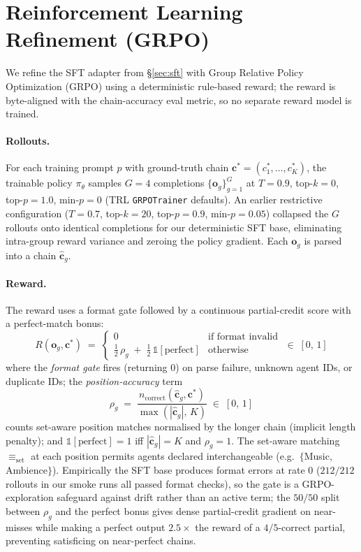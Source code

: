 \section{Reinforcement Learning Refinement (GRPO)}
\label{sec:grpo}

We refine the SFT adapter from \S\ref{sec:sft} with Group Relative
Policy Optimization (GRPO) using a deterministic rule-based reward;
the reward is byte-aligned with the chain-accuracy eval metric, so no
separate reward model is trained.

\paragraph{Rollouts.}
For each training prompt $p$ with ground-truth chain
$\mathbf{c}^*\!=\!(c^*_1,\dots,c^*_K)$, the trainable policy
$\pi_\theta$ samples $G\!=\!4$ completions $\{\mathbf{o}_g\}_{g=1}^{G}$
at $T\!=\!0.9$, top-$k\!=\!0$, top-$p\!=\!1.0$, min-$p\!=\!0$ (TRL
\texttt{GRPOTrainer} defaults). An earlier restrictive configuration
($T\!=\!0.7$, top-$k\!=\!20$, top-$p\!=\!0.9$, min-$p\!=\!0.05$)
collapsed the $G$ rollouts onto identical completions for our
deterministic SFT base, eliminating intra-group reward variance and
zeroing the policy gradient. Each $\mathbf{o}_g$ is parsed into a
chain $\hat{\mathbf{c}}_g$.

\paragraph{Reward.}
The reward uses a format gate followed by a continuous partial-credit
score with a perfect-match bonus:
\begin{equation}
R(\mathbf{o}_g,\mathbf{c}^*)
\;=\;
\begin{cases}
0 & \text{if format invalid} \\
\tfrac{1}{2}\,\rho_g \;+\; \tfrac{1}{2}\,\mathbb{1}[\text{perfect}] & \text{otherwise}
\end{cases}
\;\in\;[0,\,1]
\end{equation}
where the \emph{format gate} fires (returning $0$) on parse failure,
unknown agent IDs, or duplicate IDs; the \emph{position-accuracy} term
\begin{equation}
\rho_g \;=\; \frac{n_\text{correct}(\hat{\mathbf{c}}_g,\mathbf{c}^*)}
                 {\max(|\hat{\mathbf{c}}_g|,\,K)}
\;\in\;[0,\,1]
\end{equation}
counts set-aware position matches normalised by the longer chain
(implicit length penalty); and $\mathbb{1}[\text{perfect}]\!=\!1$ iff
$|\hat{\mathbf{c}}_g|\!=\!K$ and $\rho_g\!=\!1$. The set-aware
matching $\equiv_\text{set}$ at each position permits agents declared
interchangeable (e.g.\ $\{$Music, Ambience$\}$). Empirically the SFT
base produces format errors at rate $0$ ($212/212$ rollouts in our
smoke runs all passed format checks), so the gate is a
GRPO-exploration safeguard against drift rather than an active term;
the $50/50$ split between $\rho_g$ and the perfect bonus gives dense
partial-credit gradient on near-misses while making a perfect output
$2.5\!\times$ the reward of a $4/5$-correct partial, preventing
satisficing on near-perfect chains.

